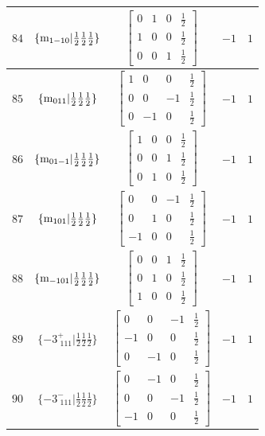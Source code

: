 \documentclass[fleqn,8pt]{jsarticle}
\begin{document}
\begin{longtable}{ccccc}
$ 84 $ & $ \{{\rm m}_{1-10}|\frac{1}{2} \frac{1}{2} \frac{1}{2}\} $ & $ \begin{bmatrix} 0 & 1 & 0 & \frac{1}{2} \\ 1 & 0 & 0 & \frac{1}{2} \\ 0 & 0 & 1 & \frac{1}{2} \end{bmatrix} $ & $ -1 $ & $ 1 $ \\ \hline
$ 85 $ & $ \{{\rm m}_{011}|\frac{1}{2} \frac{1}{2} \frac{1}{2}\} $ & $ \begin{bmatrix} 1 & 0 & 0 & \frac{1}{2} \\ 0 & 0 & -1 & \frac{1}{2} \\ 0 & -1 & 0 & \frac{1}{2} \end{bmatrix} $ & $ -1 $ & $ 1 $ \\ \hline
$ 86 $ & $ \{{\rm m}_{01-1}|\frac{1}{2} \frac{1}{2} \frac{1}{2}\} $ & $ \begin{bmatrix} 1 & 0 & 0 & \frac{1}{2} \\ 0 & 0 & 1 & \frac{1}{2} \\ 0 & 1 & 0 & \frac{1}{2} \end{bmatrix} $ & $ -1 $ & $ 1 $ \\ \hline
$ 87 $ & $ \{{\rm m}_{101}|\frac{1}{2} \frac{1}{2} \frac{1}{2}\} $ & $ \begin{bmatrix} 0 & 0 & -1 & \frac{1}{2} \\ 0 & 1 & 0 & \frac{1}{2} \\ -1 & 0 & 0 & \frac{1}{2} \end{bmatrix} $ & $ -1 $ & $ 1 $ \\ \hline
$ 88 $ & $ \{{\rm m}_{-101}|\frac{1}{2} \frac{1}{2} \frac{1}{2}\} $ & $ \begin{bmatrix} 0 & 0 & 1 & \frac{1}{2} \\ 0 & 1 & 0 & \frac{1}{2} \\ 1 & 0 & 0 & \frac{1}{2} \end{bmatrix} $ & $ -1 $ & $ 1 $ \\ \hline
$ 89 $ & $ \{-3^{+}_{\,\,111}|\frac{1}{2} \frac{1}{2} \frac{1}{2}\} $ & $ \begin{bmatrix} 0 & 0 & -1 & \frac{1}{2} \\ -1 & 0 & 0 & \frac{1}{2} \\ 0 & -1 & 0 & \frac{1}{2} \end{bmatrix} $ & $ -1 $ & $ 1 $ \\ \hline
$ 90 $ & $ \{-3^{-}_{\,\,111}|\frac{1}{2} \frac{1}{2} \frac{1}{2}\} $ & $ \begin{bmatrix} 0 & -1 & 0 & \frac{1}{2} \\ 0 & 0 & -1 & \frac{1}{2} \\ -1 & 0 & 0 & \frac{1}{2} \end{bmatrix} $ & $ -1 $ & $ 1 $ \\ \hline

\end{longtable}
\end{document}
